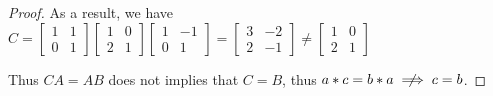 \documentclass{article}
\theoremstyle{MyNonumberplain}
\theoremstyle{break}
\newtheorem*{proof}{Proof. }
\theoremstyle{break}
\theoremstyle{break}
\theoremstyle{definition}
\theoremstyle{break}
\begin{document}
\begin{warnbox}
\begin{prfbox}
\begin{proof}
                As a result, we have $C = \left[\begin{array}{cc}
                  1 & 1\\
                  0 & 1
                \end{array}\right] \left[\begin{array}{cc}
                  1 & 0\\
                  2 & 1
                \end{array}\right] \left[\begin{array}{cc}
                  1 & - 1\\
                  0 & 1
                \end{array}\right] = \left[\begin{array}{cc}
                  3 & - 2\\
                  2 & - 1
                \end{array}\right] \neq \left[\begin{array}{cc}
                  1 & 0\\
                  2 & 1
                \end{array}\right]$\bigskip
                
                Thus $C A = A B$ does not implies that $C = B$, thus $a \ast c = b \ast a
                \centernot\implies c = b$.
            \end{proof}
        \end{prfbox}
        
\end{warnbox}
\end{document}

